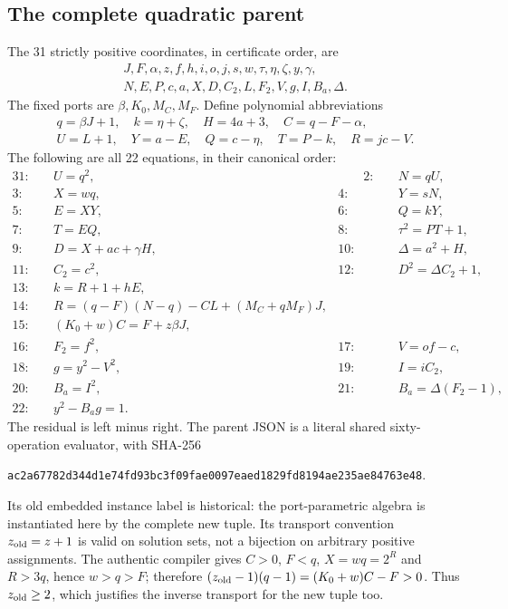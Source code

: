 \subsection{The complete quadratic parent}
The 31 strictly positive coordinates, in certificate order, are
\[
\begin{gathered}
J,F,\alpha,z,f,h,i,o,j,s,w,\tau,\eta,\zeta,y,\gamma,\\
N,E,P,c,a,X,D,C_2,L,F_2,V,g,I,B_a,\Delta.
\end{gathered}
\]
The fixed ports are $\beta,K_0,M_C,M_F$. Define polynomial abbreviations
\[
\begin{gathered}
q=\beta J+1,\quad k=\eta+\zeta,\quad H=4a+3,\quad C=q-F-\alpha,\\
U=L+1,\quad Y=a-E,\quad Q=c-\eta,\quad T=P-k,\quad R=jc-V.
\end{gathered}
\]
The following are all 22 equations, in their canonical order:
\begin{alignat*}{3}
1:\quad&U=q^2, &\qquad 2:\quad&N=qU,\\
3:\quad&X=wq, &4:\quad&Y=sN,\\
5:\quad&E=XY, &6:\quad&Q=kY,\\
7:\quad&T=EQ, &8:\quad&\tau^2=PT+1,\\
9:\quad&D=X+ac+\gamma H, &10:\quad&\Delta=a^2+H,\\
11:\quad&C_2=c^2, &12:\quad&D^2=\Delta C_2+1,\\
13:\quad&k=R+1+hE,&&\\
14:\quad&R=(q-F)(N-q)-CL+(M_C+qM_F)J,&&\\
15:\quad&(K_0+w)C=F+z\beta J,&&\\
16:\quad&F_2=f^2, &17:\quad&V=of-c,\\
18:\quad&g=y^2-V^2, &19:\quad&I=iC_2,\\
20:\quad&B_a=I^2, &21:\quad&B_a=\Delta(F_2-1),\\
22:\quad&y^2-B_ag=1.&&
\end{alignat*}
The residual is left minus right. The
parent JSON is a literal shared sixty-operation evaluator, with SHA-256
\begin{center}\small\texttt{ac2a67782d344d1e74fd93bc3f09fae0097eaed1829fd8194ae235ae84763e48}.\end{center}
Its old embedded instance label is historical: the port-parametric algebra
is instantiated here by the complete new tuple. Its transport convention
$z_{\rm old}=z+1$ is valid on solution sets, not a bijection on arbitrary
positive assignments. The authentic compiler gives $C>0$, $F<q$,
$X=wq=2^R$ and $R>3q$, hence $w>q>F$; therefore
$(z_{\rm old}-1)(q-1)=(K_0+w)C-F>0$. Thus $z_{\rm old}\ge2$, which
justifies the inverse transport for the new tuple too.

